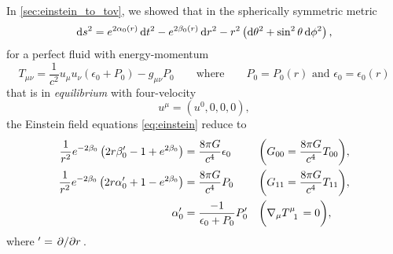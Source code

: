 In \cref{sec:einstein_to_tov}, we showed that in the spherically symmetric metric
\begin{equation}
	\mathop{}\!\mathrm{d} s^2 = e^{2 \alpha_0(r)} \mathop{}\!\mathrm{d} t^2 - e^{2 \beta_0(r)} \mathop{}\!\mathrm{d} r^2 - r^2 \left( \mathop{}\!\mathrm{d} \theta^2 + \sin^2 \theta \mathop{}\!\mathrm{d} \phi^2 \right) ,
\end{equation}
for a perfect fluid with energy-momentum
\begin{equation}
	T_{\mu \nu} = \frac{1}{c^2} u_\mu u_\nu (\epsilon_0 + P_0) - g_{\mu \nu} P_0
	\qquad \text{where} \qquad
	P_0 = P_0(r) \text{ and } \epsilon_0 = \epsilon_0(r)
\label{eq:nstars:energy_momentum}
\end{equation}
that is in \emph{equilibrium} with four-velocity
\begin{equation}
	u^\mu = (u^0, 0, 0, 0) ,
\label{eq:nstars:velocity_equilibrium}
\end{equation}
the Einstein field equations \eqref{eq:einstein} reduce to
\begin{subequations}%
\begin{align}%
	\frac{1}{r^2} e^{-2 \beta_0} \left( 2 r \beta_0' - 1 + e^{2 \beta_0} \right)  &= \frac{8 \pi G}{c^4} \epsilon_0   && \bigg( G_{00} = \frac{8 \pi G}{c^4} T_{00} \bigg) , \label{eq:nstars:field_equations_equilibrium_00} \\
	\frac{1}{r^2} e^{-2 \beta_0} \left( 2 r \alpha_0' + 1 - e^{2 \beta_0} \right) &= \frac{8 \pi G}{c^4} P_0          && \bigg( G_{11} = \frac{8 \pi G}{c^4} T_{11} \bigg) , \label{eq:nstars:field_equations_equilibrium_11} \\
	\alpha_0'                                                                     &= \frac{-1}{\epsilon_0 + P_0} P_0' && \bigg( \nabla_\mu T\indices{^\mu_1} = 0 \bigg)    , \label{eq:nstars:field_equations_equilibrium_T}
\end{align}%
\label{eq:nstars:field_equations_equilibrium}%
\end{subequations}%
where $' = \pdv{}/{r}$.


